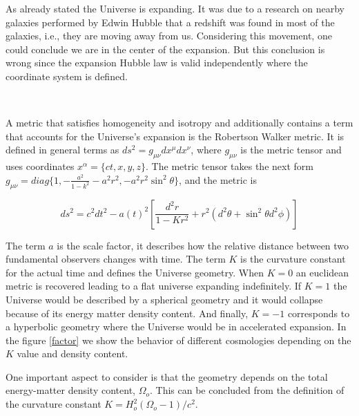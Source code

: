 As already stated the Universe is expanding. It was due to a research on nearby 
galaxies performed by Edwin Hubble that a redshift was found in most of the 
galaxies, i.e., they are moving away from us. 
Considering this movement, one could conclude we are in the center of the 
expansion. But this conclusion is wrong since the expansion Hubble law is
valid independently where the coordinate system is defined. 

\

A metric that satisfies homogeneity and isotropy and additionally
contains a term that accounts for the Universe's expansion is the Robertson 
Walker metric. It is defined in general terms as $ds^2 = g_{\mu\nu}dx^{\mu}dx^{\nu}$, 
where $g_{\mu\nu}$ is the metric tensor and uses coordinates $x^{\alpha} = \{ct,x,y,z\}$.
The metric tensor takes the next form $ g_{\mu\nu} = diag\{1,-\frac{a^2}{1-k^2}
-a^2r^2,-a^2r^2\sin^2\theta\}$, and the metric is

\begin{equation}
ds^2= c^2dt^2-a(t)^2\left[\frac{d^2r}{1-Kr^2} +r^2(d^2\theta
 + \sin^2\theta d^2\phi )\right]
\label{metric}
\end{equation} 	

The term $a$ is the scale factor, it describes how the relative
distance between two fundamental observers changes with time. 
The term $K$ is the curvature constant for the actual time and defines
the Universe geometry. When $K=0$ an euclidean metric is recovered 
leading to a flat universe expanding indefinitely. If $K=1$ the Universe
would be described by a spherical geometry and it would collapse because
of its energy matter density content. And finally, $K=-1$ corresponds to a
hyperbolic geometry where the Universe would be in accelerated expansion.  
In the figure \ref{factor} we show the behavior of different cosmologies
depending on the $K$ value and density content. 

One important aspect to consider is that the geometry depends on the 
total energy-matter density content, $\Omega_o$. This can be concluded from
the definition of the curvature constant $K = H_o^2(\Omega_o -1)/c^2$. 



